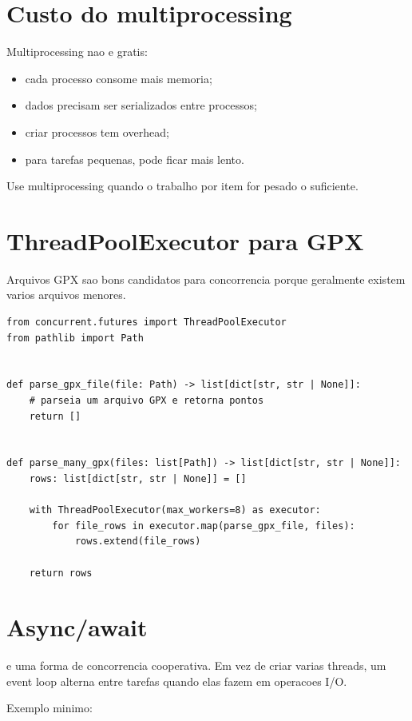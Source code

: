 \section{Custo do multiprocessing}

Multiprocessing nao e gratis:

\begin{itemize}
  \item cada processo consome mais memoria;
  \item dados precisam ser serializados entre processos;
  \item criar processos tem overhead;
  \item para tarefas pequenas, pode ficar mais lento.
\end{itemize}

Use multiprocessing quando o trabalho por item for pesado o suficiente.

\section{ThreadPoolExecutor para GPX}

Arquivos GPX sao bons candidatos para concorrencia porque geralmente existem varios arquivos menores.

\begin{lstlisting}[style=devbutterpython]
from concurrent.futures import ThreadPoolExecutor
from pathlib import Path


def parse_gpx_file(file: Path) -> list[dict[str, str | None]]:
    # parseia um arquivo GPX e retorna pontos
    return []


def parse_many_gpx(files: list[Path]) -> list[dict[str, str | None]]:
    rows: list[dict[str, str | None]] = []

    with ThreadPoolExecutor(max_workers=8) as executor:
        for file_rows in executor.map(parse_gpx_file, files):
            rows.extend(file_rows)

    return rows
\end{lstlisting}

\section{Async/await}

 e uma forma de concorrencia cooperativa. Em vez de criar varias threads, um event loop alterna entre tarefas quando elas fazem  em operacoes I/O.

Exemplo minimo:

